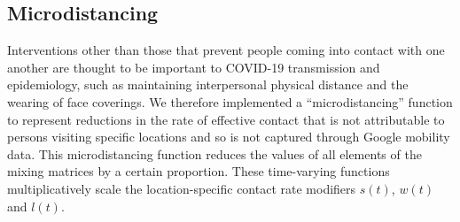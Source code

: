 \subsection{Microdistancing}
\label{microdist}
Interventions other than those that prevent people coming into contact with one another are thought to be important to COVID-19 transmission and epidemiology, such as maintaining interpersonal physical distance and the wearing of face coverings. We therefore implemented a ``microdistancing” function to represent reductions in the rate of effective contact that is not attributable to persons visiting specific locations and so is not captured through Google mobility data. This microdistancing function reduces the values of all elements of the mixing matrices by a certain proportion. These time-varying functions multiplicatively scale the location-specific contact rate modifiers \(s(t)\), \(w(t)\) and \(l(t)\).

